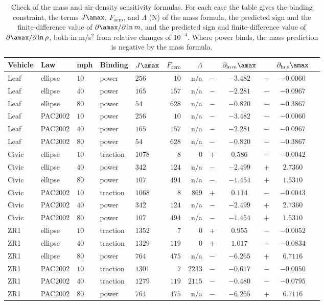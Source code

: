\begin{table}[htbp]
\centering\footnotesize
\setlength{\tabcolsep}{3.5pt}
\caption{Check of the mass and air-density sensitivity formulas. For each case the table gives the binding constraint, the terms $J\amax$, $F_{\mathrm{aero}}$, and $\Lambda$ (N) of the mass formula, the predicted sign and the finite-difference value of $\partial\amax/\partial\ln m$, and the predicted sign and finite-difference value of $\partial\amax/\partial\ln\rho$, both in m/s$^2$ from relative changes of $10^{-4}$. Where power binds, the mass prediction is negative by the mass formula.}\label{tab:app-signs}
\begin{tabular}{lllllrrrcrcr}
\toprule
Vehicle & Law & mph & Binding & $J\amax$ & $F_{\mathrm{aero}}$ & $\Lambda$ & & $\partial_{\ln m}\amax$ & & $\partial_{\ln\rho}\amax$\\
\midrule
Leaf & ellipse & $10$ & power & $256$ & $10$ & n/a & $-$ & $-3.482$ & $-$ & $-0.0060$\\
Leaf & ellipse & $40$ & power & $165$ & $157$ & n/a & $-$ & $-2.281$ & $-$ & $-0.0967$\\
Leaf & ellipse & $80$ & power & $54$ & $628$ & n/a & $-$ & $-0.820$ & $-$ & $-0.3867$\\
Leaf & PAC2002 & $10$ & power & $256$ & $10$ & n/a & $-$ & $-3.482$ & $-$ & $-0.0060$\\
Leaf & PAC2002 & $40$ & power & $165$ & $157$ & n/a & $-$ & $-2.281$ & $-$ & $-0.0967$\\
Leaf & PAC2002 & $80$ & power & $54$ & $628$ & n/a & $-$ & $-0.820$ & $-$ & $-0.3867$\\
Civic & ellipse & $10$ & traction & $1078$ & $8$ & $0$ & $+$ & $0.586$ & $-$ & $-0.0042$\\
Civic & ellipse & $40$ & power & $342$ & $124$ & n/a & $-$ & $-2.499$ & $+$ & $2.7360$\\
Civic & ellipse & $80$ & power & $107$ & $494$ & n/a & $-$ & $-1.454$ & $+$ & $1.5310$\\
Civic & PAC2002 & $10$ & traction & $1068$ & $8$ & $869$ & $+$ & $0.114$ & $-$ & $-0.0043$\\
Civic & PAC2002 & $40$ & power & $342$ & $124$ & n/a & $-$ & $-2.499$ & $+$ & $2.7360$\\
Civic & PAC2002 & $80$ & power & $107$ & $494$ & n/a & $-$ & $-1.454$ & $+$ & $1.5310$\\
ZR1 & ellipse & $10$ & traction & $1352$ & $7$ & $0$ & $+$ & $0.955$ & $-$ & $-0.0052$\\
ZR1 & ellipse & $40$ & traction & $1329$ & $119$ & $0$ & $+$ & $1.017$ & $-$ & $-0.0834$\\
ZR1 & ellipse & $80$ & power & $764$ & $475$ & n/a & $-$ & $-6.265$ & $+$ & $6.7116$\\
ZR1 & PAC2002 & $10$ & traction & $1301$ & $7$ & $2233$ & $-$ & $-0.617$ & $-$ & $-0.0050$\\
ZR1 & PAC2002 & $40$ & traction & $1279$ & $119$ & $2115$ & $-$ & $-0.480$ & $-$ & $-0.0795$\\
ZR1 & PAC2002 & $80$ & power & $764$ & $475$ & n/a & $-$ & $-6.265$ & $+$ & $6.7116$\\
\bottomrule
\end{tabular}
\end{table}
